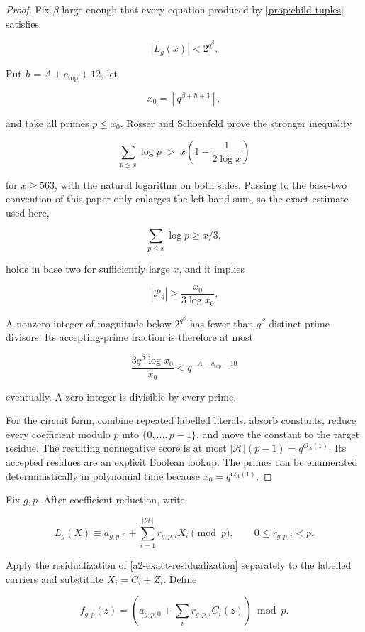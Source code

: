 \documentclass[11pt,letterpaper]{article}
\newcommand{\cref}[1]{\ref{#1}}
\theoremstyle{definition}
\theoremstyle{remark}
\begin{document}
\begin{proof} Fix \(\beta\) large enough that every equation produced by
\cref{prop:child-tuples} satisfies

\[
|L_g(x)|<2^{q^\beta}.
\]

Put \(h=A+c_{\mathrm{top}}+12\), let

\[
x_0
{}={}
\left\lceil q^{\beta+h+3}\right\rceil,
\]

and take all primes \(p\le x_0\). Rosser and Schoenfeld
\cite[Theorem 4, eq. (3.14)]{RS62} prove the stronger inequality

\[
\sum_{p\le x}\log p
\;>\;
x\left(1-\frac{1}{2\log x}\right)
\]

for \(x\ge563\), with the natural logarithm on both sides. Passing to
the base-two convention of this paper only enlarges the left-hand sum,
so the exact estimate used here,

\[
\sum_{p\le x}\log p\ge x/3,
\]

holds in base two for sufficiently large \(x\), and it implies

\[
|\mathcal P_q|
\ge
\frac{x_0}{3\log x_0}.
\]

A nonzero integer of magnitude below \(2^{q^\beta}\) has fewer than
\(q^\beta\) distinct prime divisors. Its accepting-prime fraction is
therefore at most

\[
\frac{3q^\beta\log x_0}{x_0}
{}<{}
q^{-A-c_{\mathrm{top}}-10}
\]

eventually. A zero integer is divisible by every prime.

For the circuit form, combine repeated labelled literals, absorb
constants, reduce every coefficient modulo \(p\) into
\(\{0,\ldots,p-1\}\), and move the constant to the target residue. The
resulting nonnegative score is at most \(|\mathcal H|(p-1)=q^{O_A(1)}\).
Its accepted residues are an explicit Boolean lookup. The primes can be
enumerated deterministically in polynomial time because
\(x_0=q^{O_A(1)}\). \end{proof}

Fix \(g,p\). After coefficient reduction, write

\[
L_g(X)
\equiv
a_{g,p,0}
{}+{}
\sum_{i=1}^{|\mathcal H|}
r_{g,p,i}X_i
\pmod p,
\qquad
0\le r_{g,p,i}<p.
\tag{A.13.4}
\]

Apply the residualization of \cref{a2-exact-residualization} separately to the labelled
carriers and substitute \(X_i=C_i+Z_i\). Define

\[
f_{g,p}(z)
{}={}
\left(
a_{g,p,0}
{}+{}
\sum_i r_{g,p,i}C_i(z)
\right)\bmod p.
\tag{A.13.5}
\]
\end{document}

